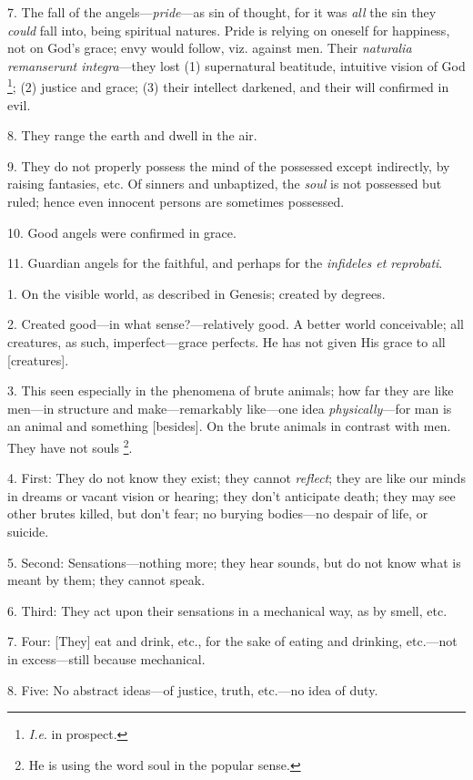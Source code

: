 7. The fall of the angels—\emph{pride}—as sin
of thought, for it was \emph{all} the sin they \emph{could} fall into,
being spiritual natures. Pride is relying on oneself for happiness,
not on God's grace; envy would follow, viz. against men. Their \emph{naturalia
remanserunt integra}—they lost (1) supernatural beatitude,
intuitive vision of God \footnote{\emph{I.e}. in prospect.};
(2) justice and grace; (3) their intellect darkened, and their will
confirmed in evil.

8. They range the earth and dwell in the air.

9. They do not properly possess the mind of the
possessed except indirectly, by raising fantasies, etc. Of sinners and
unbaptized, the \emph{soul} is not possessed but ruled; hence even
innocent persons are sometimes possessed.

10. Good angels were confirmed in grace.

11. Guardian angels for the faithful, and perhaps
for the \emph{infideles et reprobati}.


1. On the visible world, as described in Genesis;
created by degrees.

2. Created good—in what sense?—relatively
good. A better world conceivable; all creatures, as such,
imperfect—grace perfects. He has not given His grace to all
[creatures].

3. This seen especially in the phenomena of brute
animals; how far they are like men—in structure and
make—remarkably like—one idea \emph{physically}—for man is an
animal and something [besides]. On the brute animals in contrast with
men. They have not souls \footnote{He is using the word soul
in the popular sense.}.

4. First: They do not know they exist; they
cannot \emph{reflect}; they are like our minds in dreams or vacant
vision or hearing; they don't anticipate death; they may see other
brutes killed, but don't fear; no burying bodies—no despair of life,
or suicide.

5. Second: Sensations—nothing more; they hear
sounds, but do not know what is meant by them; they cannot speak.

6. Third: They act upon their sensations in a
mechanical way, as by smell, etc.

7. Four: [They] eat and drink, etc., for the sake
of eating and drinking, etc.—not in excess—still because
mechanical.

8. Five: No abstract ideas—of justice, truth,
etc.—no idea of duty.

